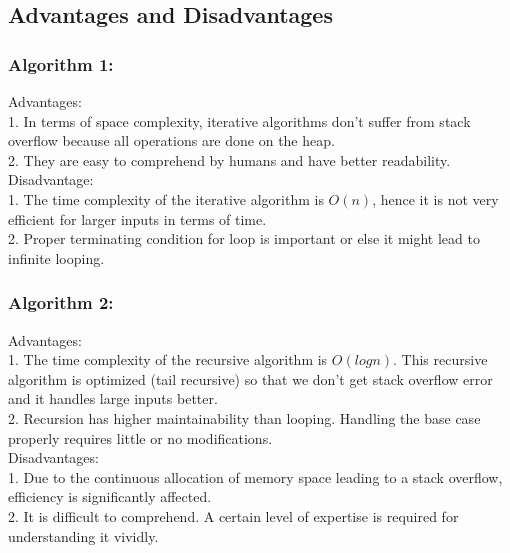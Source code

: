 \documentclass{article}
\begin{document}
\subsection*{Advantages and Disadvantages}
\subsubsection*{Algorithm 1:}
Advantages:\\
1. In terms of space complexity, iterative algorithms don't suffer from stack overflow because all operations are done on the heap. \\
2. They are easy to comprehend by humans and have better readability.\\
Disadvantage:\\
1. The time complexity of the iterative algorithm is $O (n)$, hence it is not very efficient for larger inputs in terms of time.  \\
2. Proper terminating condition for loop is important or else it might lead to infinite looping.
\subsubsection*{Algorithm 2:}
Advantages: \\
1. The time complexity of the recursive algorithm is $O (log n)$. This recursive algorithm is optimized (tail recursive) so that we don't get stack overflow error and it handles large inputs better. \\
2. Recursion has higher maintainability than looping. Handling the base case properly requires little or no modifications.\\
Disadvantages:\\
1. Due to the continuous allocation of memory space leading to a stack overflow, efficiency is significantly affected. \\
2. It is difficult to comprehend. A certain level of expertise is required for understanding it vividly.\\
\end{document}
